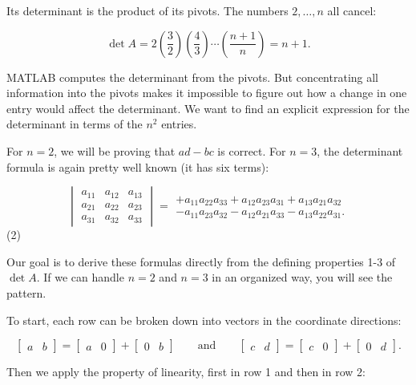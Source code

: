 Its determinant is the product of its pivots. The numbers \(2,\ldots,n\) all cancel:

\[\det A=2\left(\frac{3}{2}\right)\left(\frac{4}{3}\right)\cdots\left(\frac{n+1}{ n}\right)=n+1.\]

MATLAB computes the determinant from the pivots. But concentrating all information into the pivots makes it impossible to figure out how a change in one entry would affect the determinant. We want to find an explicit expression for the determinant in terms of the \(n^{2}\) entries.

For \(n=2\), we will be proving that \(ad-bc\) is correct. For \(n=3\), the determinant formula is again pretty well known (it has six terms):

\[\begin{vmatrix}a_{11}&a_{12}&a_{13}\\ a_{21}&a_{22}&a_{23}\\ a_{31}&a_{32}&a_{33}\end{vmatrix}=\begin{array}{c}+a_{11}a_{22}a_{33}+a_{12} a_{23}a_{31}+a_{13}a_{21}a_{32}\\ -a_{11}a_{23}a_{32}-a_{12}a_{21}a_{33}-a_{13}a_{22}a_{31}.\end{array}\] (2)

Our goal is to derive these formulas directly from the defining properties 1-3 of \(\det A\). If we can handle \(n=2\) and \(n=3\) in an organized way, you will see the pattern.

To start, each row can be broken down into vectors in the coordinate directions:

\[\begin{bmatrix}a&b\end{bmatrix}=\begin{bmatrix}a&0\end{bmatrix}+\begin{bmatrix} 0&b\end{bmatrix}\qquad\text{and}\qquad\begin{bmatrix}c&d\end{bmatrix}= \begin{bmatrix}c&0\end{bmatrix}+\begin{bmatrix}0&d\end{bmatrix}.\]

Then we apply the property of linearity, first in row 1 and then in row 2:


